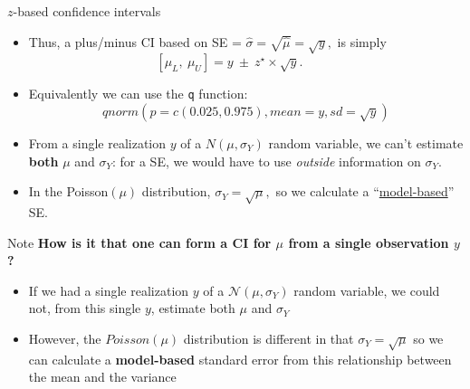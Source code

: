 \documentclass[10pt]{beamer}\usepackage[]{graphicx}\usepackage[]{color}
\begin{document}
\begin{frame}{$z$-based confidence intervals}
	\begin{itemize}
		\setlength\itemsep{1.1em}
		\item Thus, a plus/minus CI based on SE = $\hat{\sigma} =  \sqrt{\hat{\mu}} = \sqrt{y},$   is simply
		$$[ \mu_{L}, \ \mu_{U}] = y  \ \pm \ z^\star \times \sqrt{y}. \ \ \ \ \ \ \ \ \ \ \ \  $$
		\item Equivalently we can use the \texttt{q} function: $$qnorm(p = c(0.025, 0.975), mean = y, sd = \sqrt{y})$$
		
		
		\vspace*{-0.7cm}
		
		\item From a single realization $y$ of a $N(\mu,\sigma_{Y})$ random variable, we can't estimate \textbf{both} $\mu$ and $\sigma_{Y}$: for a SE, we would have to use \textit{outside} information on $\sigma_{Y}$.  
		
		
		
		\item In the  Poisson$(\mu)$ distribution, $\sigma_{Y} = \sqrt{\mu},$ so we  calculate a ``\underline{model-based}'' SE.
		
		
	\end{itemize}
	
\end{frame}


\begin{frame}
\end{frame}



\begin{frame}{Note}
	\textbf{How is it that one can form a CI for $\mu$ from a single observation $y$?}
	\vspace{0.2in}
	\pause
	\begin{itemize}
		\item If we had a single realization $y$ of a $\mathcal{N}(\mu, \sigma_{Y})$ random variable, we could not,
		from this single $y$, estimate both $\mu$ and $\sigma_{Y}$
		\item However, the $Poisson(\mu)$ distribution is different in that $\sigma_{Y} = \sqrt{\mu}$ so we can calculate a \textbf{model-based} standard error from this relationship between the mean and the variance
	\end{itemize}
	
\end{frame}
\end{document}
